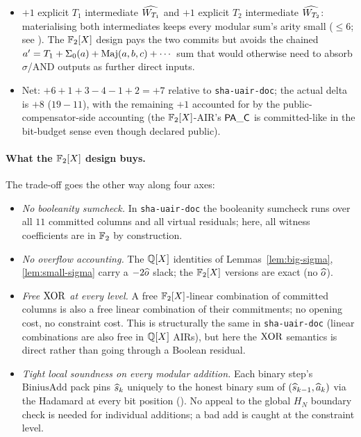 \begin{itemize}[leftmargin=2em,topsep=2pt]
        layout).
  \item $+1$ explicit $T_1$ intermediate $\widehat{W_{T_1}}$ and $+1$
        explicit $T_2$ intermediate $\widehat{W_{T_2}}$: materialising both
        intermediates keeps every modular sum's arity small
        ($\leq 6$; see ). The $\mathbb{F}_2[X]$ design pays
        the two commits but avoids the chained $a' = T_1 + \Sigma_0(a)
        + \operatorname{Maj}(a,b,c) + \cdots$ sum that would otherwise need to
        absorb $\sigma$/AND outputs as further direct inputs.
  \item Net: $+6 +1 +3 -4 -1 +2 = +7$ relative to
        \texttt{sha-uair-doc}; the actual delta is $+8$ ($19 - 11$),
        with the remaining $+1$ accounted for by the
        public-compensator-side accounting (the $\mathbb{F}_2[X]$-AIR's
        $\mathsf{PA\_C}$ is committed-like in the bit-budget sense even
        though declared public).
\end{itemize}


\paragraph{What the $\mathbb{F}_2[X]$ design buys.}
The trade-off goes the other way along four axes:
\begin{itemize}[leftmargin=2em,topsep=2pt]
  \item \emph{No booleanity sumcheck.} In \texttt{sha-uair-doc} the
        booleanity sumcheck runs over all $11$ committed columns and
        all virtual residuals; here, all witness coefficients are in
        $\mathbb{F}_2$ by construction.
  \item \emph{No overflow accounting.} The $\mathbb{Q}[X]$ identities of
        Lemmas~\ref{lem:big-sigma}, \ref{lem:small-sigma} carry a
        $-2\widehat{o}$ slack; the $\mathbb{F}_2[X]$ versions are exact (no
        $\widehat{o}$).
  \item \emph{Free $\operatorname{XOR}$ at every level.} A free $\mathbb{F}_2[X]$-linear
        combination of committed columns is also a free linear
        combination of their commitments; no opening cost, no
        constraint cost. This is structurally the same in
        \texttt{sha-uair-doc} (linear combinations are also free in
        $\mathbb{Q}[X]$ AIRs), but here the $\operatorname{XOR}$ semantics is direct rather
        than going through a Boolean residual.
  \item \emph{Tight local soundness on every modular addition.} Each
        binary step's $\mathrm{BiniusAdd}$ pack pins $\widehat{s}_k$
        uniquely to the honest binary sum of $(\widehat{s}_{k-1},
        \widehat{a}_k)$ via the Hadamard at every bit position
        (). No appeal to the global
        $H_N$ boundary check is needed for individual additions; a
        bad add is caught at the constraint level.
\end{itemize}

